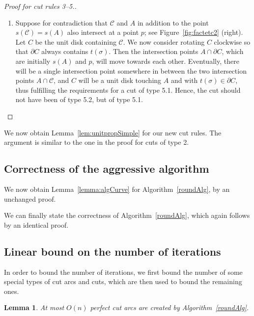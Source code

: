 \documentclass{article}
\newcommand{\se}{\sigma}
\newcommand{\cut}{\mathcal C}
\newcommand{\start}{s}
\newcommand{\terminal}{t}
\newcommand{\arcA}{A}
\newtheorem{lemma}[theorem]{Lemma}
\begin{document}
\begin{proof}[Proof for cut rules 3--5.]
\begin{enumerate}
\begin{enumerate}
\item[5.2]
Suppose for contradiction that $\cut$ and $\arcA$ in addition to the point $\start(\cut)=\start(\arcA)$ also intersect at a point $p$; see Figure~\ref{fig:factetc2} (right).
Let $C$ be the unit disk containing $\cut$.
We now consider rotating $C$ clockwise so that $\partial C$ always contains $\terminal(\se)$.
Then the intersection points $\arcA\cap \partial C$, which are initially $\start(\arcA)$ and $p$, will move towards each other.
Eventually, there will be a single intersection point somewhere in between the two intersection points $\arcA\cap\cut$, and $C$ will be a unit disk touching $\arcA$ and with $\terminal(\sigma)\in\partial C$, thus fulfilling the requirements for a cut of type 5.1.
Hence, the cut should not have been of type 5.2, but of type 5.1.
\qedhere
\end{enumerate}
\end{enumerate}
\end{proof}

We now obtain Lemma~\ref{lem:unitpropSimple} for our new cut rules.
The argument is similar to the one in the proof for cuts of type 2.

\unitdisklemma*

\subsection{Correctness of the aggressive algorithm}

We now obtain Lemma~\ref{lemma:algCurve} for Algorithm~\ref{roundAlg}, by an unchanged proof.

\lemmaalgcurve*

We can finally state the correctness of Algorithm~\ref{roundAlg}, which again follows by an identical proof.

\thmcorrect*



\subsection{Linear bound on the number of iterations}
\label{sec:linear}

In order to bound the number of iterations,  we first bound the number of some special types of cut arcs and cuts, which are then used to bound the remaining ones.

\begin{lemma}\label{lem:perfCutArcs}
At most $O(n)$ perfect cut arcs are created by Algorithm~\ref{roundAlg}.
\end{lemma}
\end{document}
